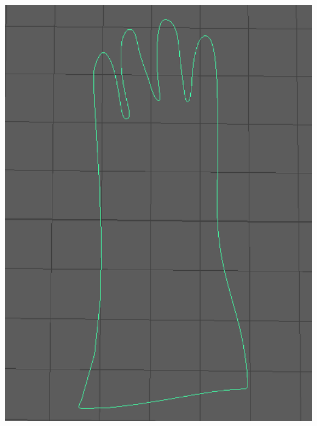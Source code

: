 \documentclass[ %
                    author={Elis Jones},
                supervisor={Dr. Kirsten Cater},
                    degree={BSc},
                     title={The Effect of Presentation Medium on Spatial Cognition},
                  subtitle={in the Virtual Environment},
                      year={2018} ]{dissertation}
\begin{document}
\begin{minipage}{\textwidth}
    \begin{center}
    \centering
    \begin{minipage}{0.18\textwidth}
        \centering
        \includegraphics[width=1\textwidth]{images/curve.png}
    \end{minipage}\hfill
    \begin{minipage}{0.18\textwidth}
        \centering

\end{minipage}
\end{center}
\end{minipage}
\end{document}
